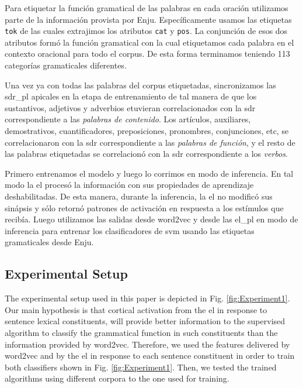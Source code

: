 {Para etiquetar la función gramatical de las palabras en cada oración utilizamos parte de la información provista por Enju.
Específicamente usamos las etiquetas \texttt{tok} de las cuales extrajimos los atributos \texttt{cat} y \texttt{pos}.
La conjunción de esos dos atributos formó la función gramatical con la cual etiquetamos cada palabra en el contexto oracional para todo el corpus.
De esta forma terminamos teniendo 113 categorías gramaticales diferentes.

Una vez ya con todas las palabras del corpus etiquetadas, sincronizamos las \gls{sdr_pl} apicales en la etapa de entrenamiento de tal manera de que los sustantivos, adjetivos y adverbios etuvieran correlacionados con la \gls{sdr} correspondiente a las \emph{palabras de contenido}. Los artículos, auxiliares, demostrativos, cuantificadores, preposiciones, pronombres, conjunciones, etc, se correlacionaron con la \gls{sdr} correspondiente a las \emph{palabras de función}, y el resto de las palabras etiquetadas se correlacionó con la \gls{sdr} correspondiente a los \emph{verbos}.

Primero entrenamos el modelo y luego lo corrimos en modo de inferencia.
En tal modo la \gls{el} procesó la información con sus propiedades de aprendizaje deshabilitadas.
De esta manera, durante la inferencia, la \gls{el} no modificó sus sinápsis y sólo retornó patrones de activación en respuesta a los estímulos que recibía.
Luego utilizamos las salidas desde word2vec y desde las \gls{el_pl} en modo de inferencia para entrenar los clasificadores de \gls{svm} usando las etiquetas gramaticales desde Enju.
}{
\subsection{Experimental Setup}

The experimental setup used in this paper is depicted in Fig. \ref{fig:Experiment1}. Our main hypothesis is that cortical activation from the \gls{el} in response to sentence lexical constituents, will provide better information to the supervised algorithm to classify the grammatical function in such constituents than the information provided by word2vec. Therefore, we used the features delivered by word2vec and by the \gls{el} in response to each sentence constituent in order to train both classifiers shown in Fig. \ref{fig:Experiment1}. Then, we tested the trained algorithms using different corpora to the one used for training.


}

